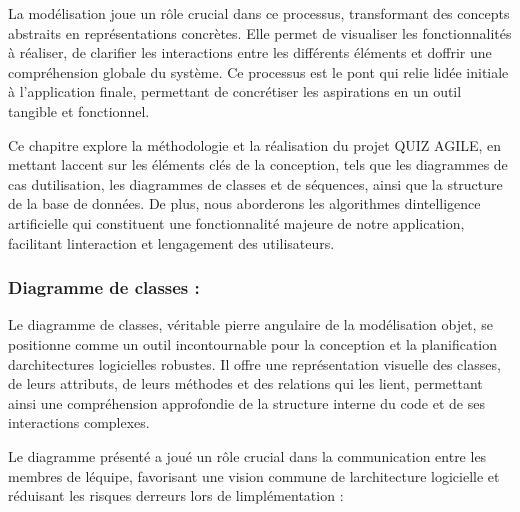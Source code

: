\documentclass[12pt,a4paper,twoside,openright]{report}
\begin{document}
La modélisation joue un rôle crucial dans ce processus, transformant des
concepts abstraits en représentations concrètes. Elle permet de
visualiser les fonctionnalités à réaliser, de clarifier les interactions
entre les différents éléments et d\textquotesingle offrir une
compréhension globale du système. Ce processus est le pont qui relie
l\textquotesingle idée initiale à l'application finale, permettant de
concrétiser les aspirations en un outil tangible et fonctionnel.

Ce chapitre explore la méthodologie et la réalisation du projet QUIZ
AGILE, en mettant l\textquotesingle accent sur les éléments clés de la
conception, tels que les diagrammes de cas
d\textquotesingle utilisation, les diagrammes de classes et de
séquences, ainsi que la structure de la base de données. De plus, nous
aborderons les algorithmes d\textquotesingle intelligence artificielle
qui constituent une fonctionnalité majeure de notre application,
facilitant l\textquotesingle interaction et l\textquotesingle engagement
des utilisateurs.

\hypertarget{diagramme-de-classes}{%
\subsubsection{\texorpdfstring{Diagramme de classes :
}{Diagramme de classes : }}\label{diagramme-de-classes}}

Le diagramme de classes, véritable pierre angulaire de la modélisation
objet, se positionne comme un outil incontournable pour la conception et
la planification d\textquotesingle architectures logicielles robustes.
Il offre une représentation visuelle des classes, de leurs attributs, de
leurs méthodes et des relations qui les lient, permettant ainsi une
compréhension approfondie de la structure interne du code et de ses
interactions complexes.

Le diagramme présenté a joué un rôle crucial dans la communication entre
les membres de l\textquotesingle équipe, favorisant une vision commune
de l\textquotesingle architecture logicielle et réduisant les risques
d\textquotesingle erreurs lors de l\textquotesingle implémentation :
\end{document}
